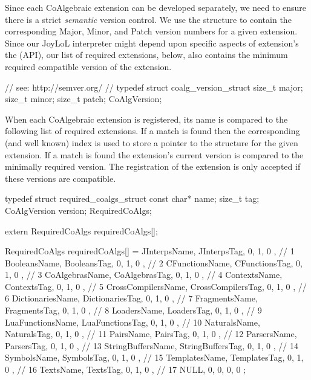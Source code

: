 Since each CoAlgebraic extension can be developed separately, we need to 
ensure there is a strict \emph{semantic} version control. We use the 
 structure to contain the corresponding Major, Minor, 
and Patch version numbers for a given extension. Since our JoyLoL 
interpreter might depend upon specific aspects of extension's the 
 (API), our list of required 
extensions, below, also contains the minimum required compatible version 
of the extension. 

\startCHeader
// see: http://semver.org/
//
typedef struct coalg_version_struct {
  size_t major;
  size_t minor;
  size_t patch;
} CoAlgVersion;
\stopCHeader

When each CoAlgebraic extension is registered, its name is compared to the 
following list of required extensions. If a match is found then the 
corresponding (and well known) index is used to store a pointer to the 
 structure for the given extension. If a match is found 
the extension's current version is compared to the minimally required 
version. The registration of the extension is only accepted if these 
versions are compatible. 

\startCHeader
typedef struct required_coalgs_struct {
  const char*  name;
  size_t       tag;
  CoAlgVersion version;
} RequiredCoAlgs;

extern RequiredCoAlgs requiredCoAlgs[];
\stopCHeader
{}

\startCCode
RequiredCoAlgs requiredCoAlgs[] = {
  { JInterpsName,       JInterpsTag,       {0, 1, 0 }}, //  1
  { BooleansName,       BooleansTag,       {0, 1, 0 }}, //  2
  { CFunctionsName,     CFunctionsTag,     {0, 1, 0 }}, //  3
  { CoAlgebrasName,     CoAlgebrasTag,     {0, 1, 0 }}, //  4
  { ContextsName,       ContextsTag,       {0, 1, 0 }}, //  5
  { CrossCompilersName, CrossCompilersTag, {0, 1, 0 }}, //  6
  { DictionariesName,   DictionariesTag,   {0, 1, 0 }}, //  7
  { FragmentsName,      FragmentsTag,      {0, 1, 0 }}, //  8
  { LoadersName,        LoadersTag,        {0, 1, 0 }}, //  9
  { LuaFunctionsName,   LuaFunctionsTag,   {0, 1, 0 }}, // 10
  { NaturalsName,       NaturalsTag,       {0, 1, 0 }}, // 11
  { PairsName,          PairsTag,          {0, 1, 0 }}, // 12
  { ParsersName,        ParsersTag,        {0, 1, 0 }}, // 13
  { StringBuffersName,  StringBuffersTag,  {0, 1, 0 }}, // 14
  { SymbolsName,        SymbolsTag,        {0, 1, 0 }}, // 15
  { TemplatesName,      TemplatesTag,      {0, 1, 0 }}, // 16
  { TextsName,          TextsTag,          {0, 1, 0 }}, // 17
  { NULL,               0,                 {0, 0, 0 }}
};
\stopCCode

